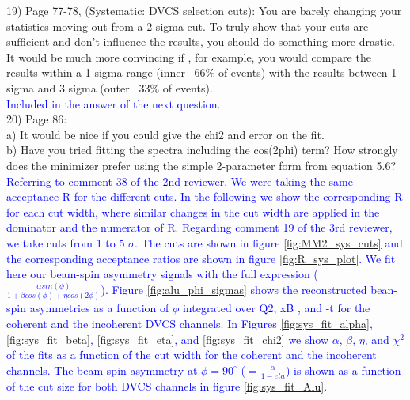 19) Page 77-78, (Systematic: DVCS selection cuts): You are barely changing your 
statistics moving out from a 2 sigma cut. To truly show that your cuts are 
sufficient and don't influence the results, you should do something more 
drastic. It would be much more convincing if , for example, you would compare 
the results within a 1 sigma range (inner ~66$\%$ of events) with the results 
between 1 sigma and 3 sigma (outer ~33$\%$ of events).\\
 \textcolor{blue}{Included in the answer of the next question.}\\

20) Page 86:\\
  a) It would be nice if you could give the chi2 and error on the fit.\\
  b) Have you tried fitting the spectra including the cos(2phi) term? How 
strongly does the minimizer prefer using the simple 2-parameter form from 
equation 5.6?\\
\textcolor{blue}{ Referring to comment 38 of the 2nd reviewer. We were taking 
the same acceptance R for the different cuts. In the following we show the 
corresponding R for each cut width, where similar changes in the cut width are 
applied in the dominator and the numerator of R. Regarding comment 19 of the 
3rd reviewer, we take cuts from 1 to 5 $\sigma$.  The cuts are shown in figure 
\ref{fig:MM2_sys_cuts} and the corresponding acceptance ratios are shown in 
figure \ref{fig:R_sys_plot}. We fit here our beam-spin asymmetry 
signals with the full expression ($\frac{\alpha sin(\phi)}{1 + \beta cos(\phi) 
+ \eta cos(2\phi)}$). Figure \ref{fig:alu_phi_sigmas} shows the reconstructed 
bean-spin asymmetries as a function of $\phi$ integrated over Q2, xB , and -t 
for the coherent and the incoherent DVCS channels. In Figures 
\ref{fig:sys_fit_alpha}, \ref{fig:sys_fit_beta}, \ref{fig:sys_fit_eta}, and 
\ref{fig:sys_fit_chi2} we show $\alpha$, $\beta$, $\eta$, and $\chi^{2}$ of the 
fits as a function of the cut width for the coherent and the incoherent 
channels. The beam-spin asymmetry at $\phi = 90 ^{\circ}$ ($= 
\frac{\alpha}{1-eta}$) is shown as a function of the cut size for both DVCS 
channels in figure \ref{fig:sys_fit_Alu}. }

